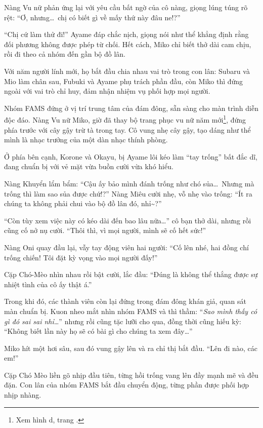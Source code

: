 \documentclass[../main.tex]{subfiles}
\begin{document}
Nàng Vu nữ phản ứng lại với yêu cầu bất ngờ của cô nàng, giọng lúng túng rõ rệt: ``Ơ, nhưng\dots\ chị có biết gì về mấy thứ này đâu ne!?''

``Chị cứ làm thử đi!'' Ayame đáp chắc nịch, giọng nói như thể khẳng định rằng đối phương không được phép từ chối. Hết cách, Miko chỉ biết thở dài cam chịu, rồi đi theo cả nhóm đến gần bộ đồ lân.

Với năm người lính mới, họ bắt đầu chia nhau vai trò trong con lân: Subaru và Mio làm chân sau, Fubuki và Ayame phụ trách phần đầu, còn Miko thì đứng ngoài với vai trò chỉ huy, đảm nhận nhiệm vụ phối hợp mọi người.

\ct

Nhóm FAMS đứng ở vị trí trung tâm của đám đông, sẵn sàng cho màn trình diễn độc đáo. Nàng Vu nữ Miko, giờ đã thay bộ trang phục vu nữ năm mới\footnote{Xem hình d, trang \pageref{settwo}.}, đứng phía trước với cây gậy trừ tà trong tay. Cô vung nhẹ cây gậy, tạo dáng như thể mình là nhạc trưởng của một dàn nhạc thính phòng.

Ở phía bên cạnh, Korone và Okayu, bị Ayame lôi kéo làm ``tay trống'' bất đắc dĩ, đang chuẩn bị với vẻ mặt vừa buồn cười vừa khó hiểu.

Nàng Khuyển lẩm bẩm: ``Cậu ấy bảo mình đánh trống như chó sủa\dots\ Nhưng mà trống thì làm sao sủa được chứ!?'' Nàng Miêu cười nhẹ, vỗ nhẹ vào trống: ``Ít ra chúng ta không phải chui vào bộ đồ lân đó, nhỉ\~{}?''

``Còn tùy xem việc này có kéo dài đến bao lâu nữa\dots'' cô bạn thở dài, nhưng rồi cũng cố nở nụ cười. ``Thôi thì, vì mọi người, mình sẽ cố hết sức!''

Nàng Oni quay đầu lại, vẫy tay động viên hai người: ``Cố lên nhé, hai đồng chí trống chiến! Tôi đặt kỳ vọng vào mọi người đấy!''

Cặp Chó-Mèo nhìn nhau rồi bật cười, lắc đầu: ``Đúng là không thể thắng được sự nhiệt tình của cô ấy thật á.''

Trong khi đó, các thành viên còn lại đứng trong đám đông khán giả, quan sát màn chuẩn bị. Kuon nheo mắt nhìn nhóm FAMS và thì thầm: ``\textit{Sao mình thấy có gì đó sai sai nhỉ\dots}'' nhưng rồi cũng tặc lưỡi cho qua, đồng thời cũng hiếu kỳ: ``Không biết lần này họ sẽ có bài gì cho chúng ta xem đây\dots''

Miko hít một hơi sâu, sau đó vung gậy lên và ra chỉ thị bắt đầu. ``Lên đi nào, các em!''

Cặp Chó Mèo liền gõ nhịp đầu tiên, từng hồi trống vang lên đầy mạnh mẽ và đều đặn. Con lân của nhóm FAMS bắt đầu chuyển động, từng phần được phối hợp nhịp nhàng.
\end{document}
